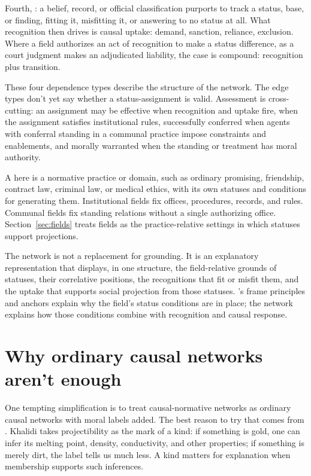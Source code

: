 \documentclass[12pt]{article}
\begin{document}
Fourth, : a belief, record, or official classification purports to track a status, base, or finding, fitting it, misfitting it, or answering to no status at all. What recognition then drives is causal uptake: demand, sanction, reliance, exclusion. Where a field authorizes an act of recognition to make a status difference, as a court judgment makes an adjudicated liability, the case is compound: recognition plus transition.

These four dependence types describe the structure of the network. The edge types don't yet say whether a status-assignment is valid. Assessment is cross-cutting: an assignment may be effective when recognition and uptake fire,  when the assignment satisfies institutional rules, successfully conferred when agents with conferral standing in a communal practice impose constraints and enablements, and morally warranted when the standing or treatment has moral authority.

A  here is a normative practice or domain, such as ordinary promising, friendship, contract law, criminal law, or medical ethics, with its own statuses and conditions for generating them. Institutional fields fix offices, procedures, records, and rules. Communal fields fix standing relations without a single authorizing office. Section~\ref{sec:fields} treats fields as the practice-relative settings in which statuses support projections.

The network is not a replacement for grounding. It is an explanatory representation that displays, in one structure, the field-relative grounds of statuses, their correlative positions, the recognitions that fit or misfit them, and the uptake that supports social projection from those statuses. \textcite{epstein2015AntTrap}'s frame principles and anchors explain why the field's status conditions are in place; the network explains how those conditions combine with recognition and causal response.

\section{Why ordinary causal networks aren't enough}
\label{sec:causal-not-enough}

One tempting simplification is to treat causal-normative networks as ordinary causal networks with moral labels added. The best reason to try that comes from \textcite{khalidi2018nodes}. Khalidi takes projectibility as the mark of a kind: if something is gold, one can infer its melting point, density, conductivity, and other properties; if something is merely dirt, the label tells us much less. A kind matters for explanation when membership supports such inferences.
\end{document}
